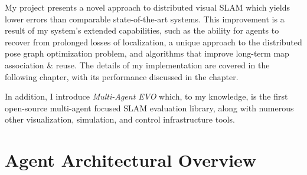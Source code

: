 






\label{sec:3}

My project presents a novel approach to distributed visual SLAM which yields lower errors than comparable state-of-the-art systems. This improvement is a result of my system's extended capabilities, such as the ability for agents to recover from prolonged losses of localization, a unique approach to the distributed pose graph optimization problem, and algorithms that improve long-term map association \& reuse. The details of my implementation are covered in the following chapter, with its performance discussed in the  chapter.

In addition, I introduce \textit{Multi-Agent EVO} which, to my knowledge, is the first open-source multi-agent focused SLAM evaluation library, along with numerous other visualization, simulation, and control infrastructure tools.

\section{Agent Architectural Overview}
\label{sec:architectural-overview}

